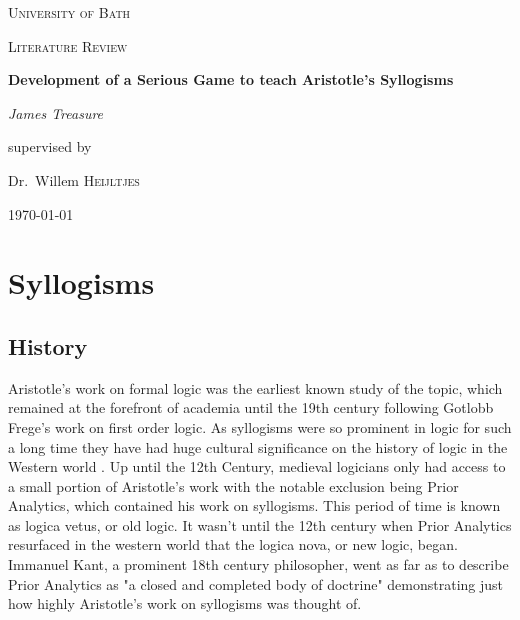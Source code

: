 \documentclass[12pt,a4paper]{report}
\begin{document}
\begin{titlepage}
	\centering
	{\scshape\LARGE University of Bath \par}
	\vspace{1cm}
	{\scshape\Large Literature Review\par}
	\vspace{1.5cm}
	{\huge\bfseries Development of a Serious Game to teach Aristotle's Syllogisms\par}
	\vspace{2cm}
	{\Large\itshape James Treasure\par}
	\vfill
	supervised by\par
	Dr.~Willem \textsc{Heijltjes}
	\vfill
	{\large \today\par}
\end{titlepage}

\tableofcontents
\chapter{Syllogisms}
\section{History}

Aristotle's work on formal logic was the earliest known study of the topic, which remained at the forefront of academia until the 19th century following Gotlobb Frege's work on first order logic. As syllogisms were so prominent in logic for such a long time they have had huge cultural significance on the history of logic in the Western world \citep{sep-aristotle-logic}. Up until the 12th Century, medieval logicians only had access to a small portion of Aristotle's work with the notable exclusion being Prior Analytics, which contained his work on syllogisms. This period of time is known as logica vetus, or old logic. It wasn't until the 12th century when Prior Analytics resurfaced in the western world that the logica nova, or new logic, began. Immanuel Kant, a prominent 18th century philosopher, went as far as to describe Prior Analytics as "a closed and completed body of doctrine" demonstrating just how highly Aristotle's work on syllogisms was thought of.
\end{document}
